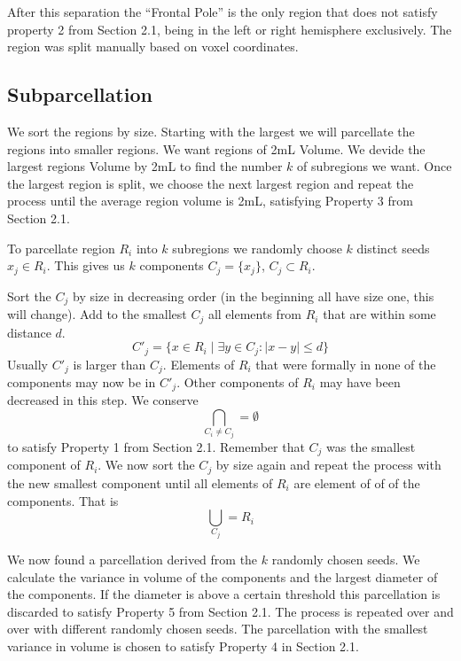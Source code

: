 \documentclass[12pt, a4paper]{article}
\begin{document}
After this separation the ``Frontal Pole'' is the only region that does not satisfy property 2 from Section 2.1, being in the left or right hemisphere exclusively. The region was split manually based on voxel coordinates.

\subsection{Subparcellation}
We sort the regions by size. Starting with the largest we will parcellate the regions into smaller regions. We want regions of 2mL Volume. We devide the largest regions Volume by 2mL to find the number $k$ of subregions we want.
Once the largest region is split, we choose the next largest region and repeat the process until the average region volume is 2mL, satisfying Property 3 from Section 2.1.

To parcellate region $R_i$ into $k$ subregions we randomly choose $k$ distinct seeds $x_j \in R_i$. This gives us $k$ components $C_j = \{ x_j \}$, $C_j \subset R_i$.

Sort the $C_j$ by size in decreasing order (in the beginning all have size one, this will change).
Add to the smallest $C_j$ all elements from $R_i$ that are within some distance $d$.
\begin{equation}
 C'_j = \{ x \in R_i \mid \exists y \in C_j : |x-y| \leq d \}
\end{equation}
Usually $C'_j$ is larger than $C_j$. Elements of $R_i$ that were formally in none of the components may now be in $C'_j$. Other components of $R_i$ may have been decreased in this step. We conserve 
\begin{equation}
 \bigcap_{C_i \neq C_j} = \emptyset
\end{equation}
to satisfy Property 1 from Section 2.1.
Remember that $C_j$ was the smallest component of $R_i$. We now sort the $C_j$ by size again and repeat the process with the new smallest component until all elements of $R_i$ are element of of of the components. That is
\begin{equation}
 \bigcup_{C_j} = R_i
\end{equation}

We now found a parcellation derived from the $k$ randomly chosen seeds.
We calculate the variance in volume of the components and the largest diameter of the components. If the diameter is above a certain threshold this parcellation is discarded to satisfy Property 5 from Section 2.1.
The process is repeated over and over with different randomly chosen seeds. 
The parcellation with the smallest variance in volume is chosen to satisfy Property 4 in Section 2.1.
\end{document}

